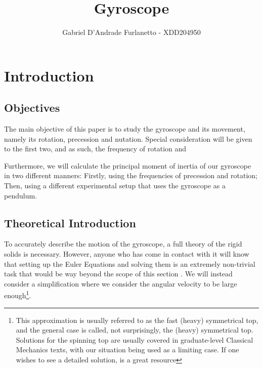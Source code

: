 \documentclass[a4paper,12pt]{article}
\begin{document}
\title{Gyroscope}
\author{Gabriel D'Andrade Furlanetto - XDD204950}
\maketitle


\pagebreak 
\section{Introduction}

\subsection{Objectives}

The main objective of this paper is to study the gyroscope and its movement, namely its rotation, precession and nutation. Special consideration will be given to the first two, and as such, the frequency of rotation and 

Furthermore, we will calculate the principal moment of inertia of our gyroscope in two different manners: Firstly, using the frequencies of precession and rotation; Then, using a different experimental setup that uses the gyroscope as a pendulum.

\subsection{Theoretical Introduction}
To accurately describe the motion of the gyroscope, a full theory of the rigid solids is necessary. However, anyone who has come in contact with it will know that setting up the Euler Equations and solving them is an extremely non-trivial task that would be way beyond the scope of this section . We will instead consider a simplification where we consider the angular velocity to be large enough\footnote{This approximation is usually referred to as the fast (heavy) symmetrical top, and the general case is called, not surprisingly, the (heavy) symmetrical top. Solutions for the spinning top are usually covered in graduate-level Classical Mechanics texts, with our situation being used as a limiting case. If one wishes to see a detailed solution, \cite[208]{goldstein} is a great resource}. 
\end{document}
